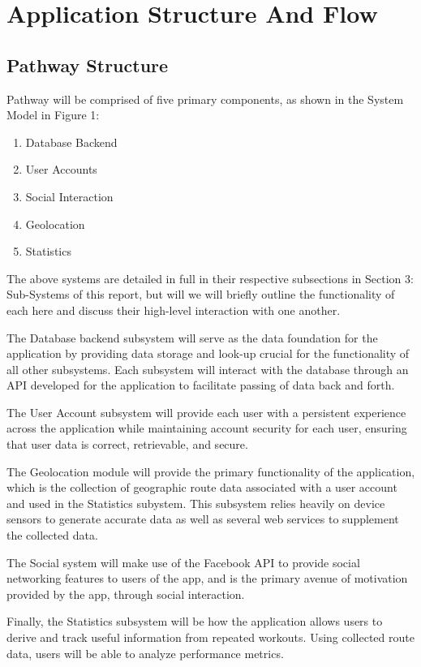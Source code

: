 \documentclass{article}
\begin{document}
\pagebreak


\section{Application Structure And Flow}
\subsection{Pathway Structure}

Pathway will be comprised of five primary components, as shown in the System Model in Figure 1:
\begin{enumerate}
    \item Database Backend
    \item User Accounts
    \item Social Interaction
    \item Geolocation
    \item Statistics
\end{enumerate}
The above systems are detailed in full in their respective subsections in Section 3: Sub-Systems of this report, but will we will briefly outline the functionality of each here and discuss their high-level interaction with one another.

The Database backend subsystem will serve as the data foundation for the application by providing data storage and look-up crucial for the functionality of all other subsystems. Each subsystem will interact with the database through an API developed for the application to facilitate passing of data back and forth.

The User Account subsystem will provide each user with a persistent experience across the application while maintaining account security for each user, ensuring that user data is correct, retrievable, and secure.

The Geolocation module will provide the primary functionality of the application, which is the collection of geographic route data associated with a user account and used in the Statistics subystem. This subsystem relies heavily on device sensors to generate accurate data as well as several web services to supplement the collected data.

The Social system will make use of the Facebook API to provide social networking features to users of the app, and is the primary avenue of motivation provided by the app, through social interaction.

Finally, the Statistics subsystem will be how the application allows users to derive and track useful information from repeated workouts. Using collected route data, users will be able to analyze performance metrics.
\end{document}
